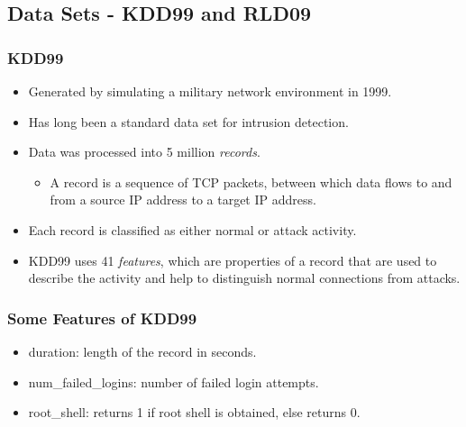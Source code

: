 \documentclass{beamer}
\newcommand{\linespace}{\vskip 0.25cm}
\begin{document}
\subsection{Data Sets - KDD99 and RLD09}
\begin{frame}
  \frametitle{KDD99}
	\begin{itemize}
		\item Generated by simulating a military network environment in 1999.
		\item Has long been a standard data set for intrusion detection.
		
\linespace		
		
		\item Data was processed into 5 million \emph{records}.
			\begin{itemize}
				\item A record is a sequence of TCP packets, between which data flows to and from a source IP address to a target IP address.
			\end{itemize}
		\item Each record is classified as either normal or attack activity.

\linespace

		\item KDD99 uses 41 \emph{features}, which are properties of a record that are used to describe the activity and help to distinguish normal connections from attacks.

	\end{itemize}
\end{frame}


\begin{frame}
  \frametitle{Some Features of KDD99}
	\begin{itemize}
		\item duration: length of the record in seconds.
		\item num\_failed\_logins: number of failed login attempts.
		\item root\_shell: returns 1 if root shell is obtained, else returns 0.
	\end{itemize}
\end{frame}
\end{document}
